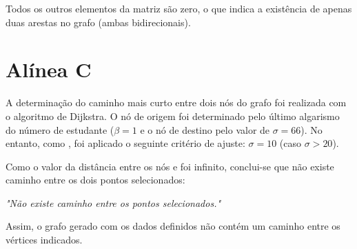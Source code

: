 Todos os outros elementos da matriz são zero, o que indica a existência de apenas duas arestas no grafo (ambas bidirecionais).

\section*{Alínea C}

A determinação do caminho mais curto entre dois nós do grafo foi realizada com o algoritmo de Dijkstra. O nó de origem foi determinado pelo último algarismo do número de estudante (\(\beta = 1\) e o nó de destino pelo valor de \(\sigma = 66\)). No entanto, como , foi aplicado o seguinte critério de ajuste:
\newline
\(\sigma = 10\) (caso \(\sigma > 20\)).

Como o valor da distância entre os nós  e  foi infinito, conclui-se que não existe caminho entre os dois pontos selecionados:
\begin{center}
\textit{"Não existe caminho entre os pontos selecionados."}
\end{center}

\bigskip

\noindent Assim, o grafo gerado com os dados definidos não contém um caminho entre os vértices indicados.
